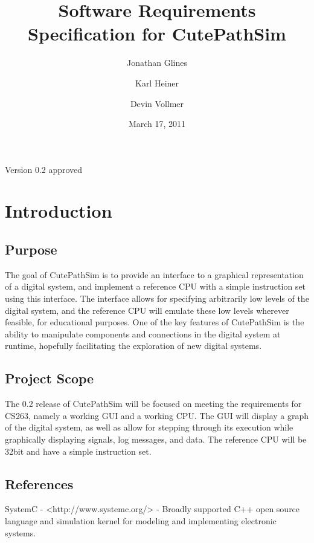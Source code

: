 \documentclass[12pt]{article}
\begin{document}
\title{Software Requirements Specification for CutePathSim}
\date{March 17, 2011}
\author{Jonathan Glines \and Karl Heiner \and Devin Vollmer}

\maketitle

\begin{center}\large{Version 0.2 approved}\end{center}

\pagebreak

\tableofcontents

\pagebreak

\section{Introduction}

\subsection{Purpose}
The goal of CutePathSim is to provide an interface to a graphical representation of a digital system, and implement a reference CPU with a simple instruction set using this interface. The interface allows for specifying arbitrarily low levels of the digital system, and the reference CPU will emulate these low levels wherever feasible, for educational purposes. One of the key features of CutePathSim is the ability to manipulate components and connections in the digital system at runtime, hopefully facilitating the exploration of new digital systems.

\subsection{Project Scope}
The 0.2 release of CutePathSim will be focused on meeting the requirements for CS263, namely a working GUI and a working CPU. The GUI will display a graph of the digital system, as well as allow for stepping through its execution while graphically displaying signals, log messages, and data. The reference CPU will be 32bit and have a simple instruction set.

\subsection{References}
SystemC - {\textless}http://www.systemc.org/{\textgreater} - Broadly supported C++ open source language and simulation kernel for modeling and implementing electronic systems.
\end{document}
